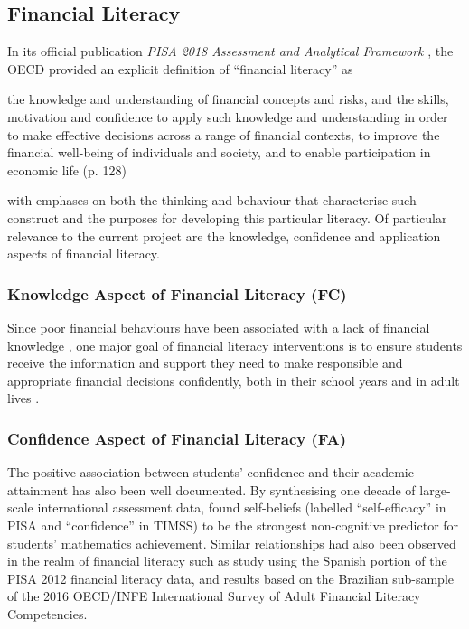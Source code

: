 \subsection{Financial Literacy}

In its official publication \textit{PISA 2018 Assessment and Analytical Framework} \parencite{PISAframework}, the OECD provided an explicit definition of ``financial literacy'' as
\begin{MAEquote}
    the knowledge and understanding of financial concepts and risks, and the skills, motivation and confidence to apply such knowledge and understanding in order to make effective decisions across a range of financial contexts, to improve the financial well-being of individuals and society, and to enable participation in economic life (p. 128)
\end{MAEquote}
with emphases on both the thinking and behaviour that characterise such construct and the purposes for developing this particular literacy. Of particular relevance to the current project are the knowledge, confidence and application aspects of financial literacy.


\subsubsection{Knowledge Aspect of Financial Literacy (FC)}

Since poor financial behaviours have been associated with a lack of financial knowledge \parencite{hastings:2013, lusardi:2014}, one major goal of financial literacy interventions is to ensure students receive the information and support they need to make responsible and appropriate financial decisions confidently, both in their school years and in adult lives \parencite{PISAvol4}.

\subsubsection{Confidence Aspect of Financial Literacy (FA)}

The positive association between students' confidence and their academic attainment has also been well documented. By synthesising one decade of large-scale international assessment data, \textcite{lee:2018} found self-beliefs (labelled ``self-efficacy'' in PISA and ``confidence'' in TIMSS) to be the strongest non-cognitive predictor for students' mathematics achievement. Similar relationships had also been observed in the realm of financial literacy such as  study using the Spanish portion of the PISA 2012 financial literacy data, and  results based on the Brazilian sub-sample of the 2016 OECD/INFE International Survey of Adult Financial Literacy Competencies.

